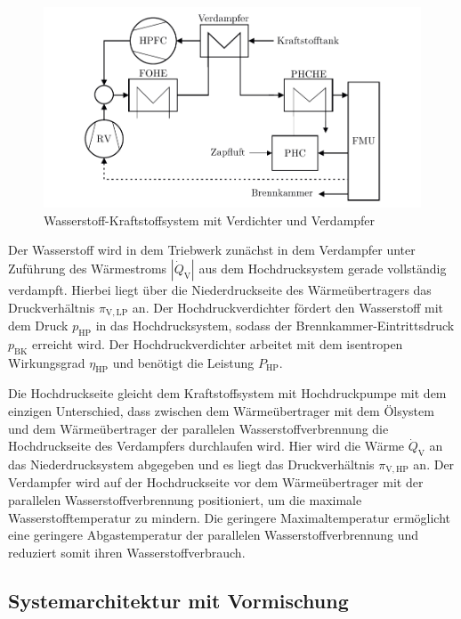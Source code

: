 \begin{figure}[ht]
\centering
\includegraphics[width=0.85\linewidth]{4_Abbildungen/2_Hauptteil/Kraftstoffsystem Abbildungen/after.pdf}
  \caption{Wasserstoff-Kraftstoffsystem mit Verdichter und Verdampfer}
  \label{fig:verdampfer}
\end{figure}
\FloatBarrier 

Der Wasserstoff wird in dem Triebwerk zunächst in dem Verdampfer unter Zuführung des Wärmestroms $|\dot{Q}_\mathrm{V}|$ aus dem Hochdrucksystem gerade vollständig verdampft. Hierbei liegt über die Niederdruckseite des Wärmeübertragers das Druckverhältnis $\pi_{\mathrm{V,LP}}$ an. Der Hochdruckverdichter fördert den Wasserstoff mit dem Druck $p_{\mathrm{HP}}$ in das Hochdrucksystem, sodass der Brennkammer-Eintrittsdruck $p_{\mathrm{BK}}$ erreicht wird. Der Hochdruckverdichter arbeitet mit dem isentropen Wirkungsgrad $\eta_{\mathrm{HP}}$ und benötigt die Leistung $P_{\mathrm{HP}}$. 

Die Hochdruckseite gleicht dem Kraftstoffsystem mit Hochdruckpumpe mit dem einzigen Unterschied, dass zwischen dem Wärmeübertrager mit dem Ölsystem und dem Wärmeübertrager der parallelen Wasserstoffverbrennung die Hochdruckseite des Verdampfers durchlaufen wird. Hier wird die Wärme $\dot{Q}_\mathrm{V}$ an das Niederdrucksystem abgegeben und es liegt das Druckverhältnis $\pi_{\mathrm{V,HP}}$ an. Der Verdampfer wird auf der Hochdruckseite vor dem Wärmeübertrager mit der parallelen Wasserstoffverbrennung positioniert, um die maximale Wasserstofftemperatur zu mindern. Die geringere Maximaltemperatur ermöglicht eine geringere Abgastemperatur der parallelen Wasserstoffverbrennung und reduziert somit ihren Wasserstoffverbrauch.

\subsection{Systemarchitektur mit Vormischung}

